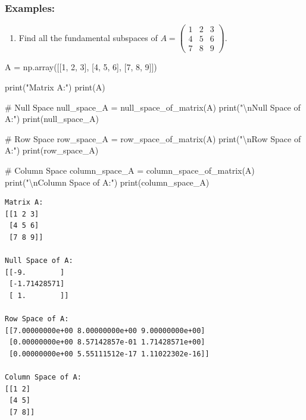 \documentclass[
  letterpaper,
  DIV=11,
  numbers=noendperiod]{scrreprt}
\newenvironment{Shaded}{\begin{snugshade}}{\end{snugshade}}
\newcommand{\BuiltInTok}[1]{\textcolor[rgb]{0.00,0.23,0.31}{#1}}
\newcommand{\CharTok}[1]{\textcolor[rgb]{0.13,0.47,0.30}{#1}}
\newcommand{\CommentTok}[1]{\textcolor[rgb]{0.37,0.37,0.37}{#1}}
\newcommand{\DecValTok}[1]{\textcolor[rgb]{0.68,0.00,0.00}{#1}}
\newcommand{\NormalTok}[1]{\textcolor[rgb]{0.00,0.23,0.31}{#1}}
\newcommand{\OperatorTok}[1]{\textcolor[rgb]{0.37,0.37,0.37}{#1}}
\newcommand{\StringTok}[1]{\textcolor[rgb]{0.13,0.47,0.30}{#1}}
\providecommand{\tightlist}{%
  \setlength{\itemsep}{0pt}\setlength{\parskip}{0pt}}\usepackage{longtable,booktabs,array}
\theoremstyle{plain}
\theoremstyle{definition}
\theoremstyle{remark}
\begin{document}
\subsubsection*{Examples:}\label{examples}

\begin{enumerate}
\def\labelenumi{\arabic{enumi}.}
\tightlist
\item
  Find all the fundamental subspaces of
  \(A=\begin{pmatrix}1&2&3\\ 4&5&6\\7&8&9\end{pmatrix}\).
\end{enumerate}

\begin{Shaded}
\begin{Highlighting}[]
\NormalTok{A }\OperatorTok{=}\NormalTok{ np.array([[}\DecValTok{1}\NormalTok{, }\DecValTok{2}\NormalTok{, }\DecValTok{3}\NormalTok{],}
\NormalTok{              [}\DecValTok{4}\NormalTok{, }\DecValTok{5}\NormalTok{, }\DecValTok{6}\NormalTok{],}
\NormalTok{              [}\DecValTok{7}\NormalTok{, }\DecValTok{8}\NormalTok{, }\DecValTok{9}\NormalTok{]])}

\BuiltInTok{print}\NormalTok{(}\StringTok{"Matrix A:"}\NormalTok{)}
\BuiltInTok{print}\NormalTok{(A)}

\CommentTok{\# Null Space}
\NormalTok{null\_space\_A }\OperatorTok{=}\NormalTok{ null\_space\_of\_matrix(A)}
\BuiltInTok{print}\NormalTok{(}\StringTok{"}\CharTok{\textbackslash{}n}\StringTok{Null Space of A:"}\NormalTok{)}
\BuiltInTok{print}\NormalTok{(null\_space\_A)}

\CommentTok{\# Row Space}
\NormalTok{row\_space\_A }\OperatorTok{=}\NormalTok{ row\_space\_of\_matrix(A)}
\BuiltInTok{print}\NormalTok{(}\StringTok{"}\CharTok{\textbackslash{}n}\StringTok{Row Space of A:"}\NormalTok{)}
\BuiltInTok{print}\NormalTok{(row\_space\_A)}

\CommentTok{\# Column Space}
\NormalTok{column\_space\_A }\OperatorTok{=}\NormalTok{ column\_space\_of\_matrix(A)}
\BuiltInTok{print}\NormalTok{(}\StringTok{"}\CharTok{\textbackslash{}n}\StringTok{Column Space of A:"}\NormalTok{)}
\BuiltInTok{print}\NormalTok{(column\_space\_A)}
\end{Highlighting}
\end{Shaded}

\begin{verbatim}
Matrix A:
[[1 2 3]
 [4 5 6]
 [7 8 9]]

Null Space of A:
[[-9.        ]
 [-1.71428571]
 [ 1.        ]]

Row Space of A:
[[7.00000000e+00 8.00000000e+00 9.00000000e+00]
 [0.00000000e+00 8.57142857e-01 1.71428571e+00]
 [0.00000000e+00 5.55111512e-17 1.11022302e-16]]

Column Space of A:
[[1 2]
 [4 5]
 [7 8]]
\end{verbatim}
\end{document}
